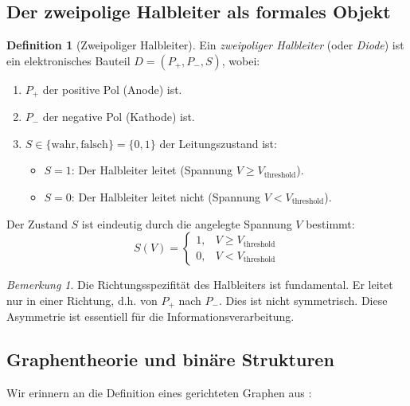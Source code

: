 \documentclass[12pt, a4paper]{article}
\theoremstyle{definition}
\newtheorem{definition}[theorem]{Definition}
\theoremstyle{remark}
\newtheorem{remark}[theorem]{Bemerkung}
\newcommand{\Bool}{\{\mathrm{wahr}, \mathrm{falsch}\}}
\begin{document}
\subsection{Der zweipolige Halbleiter als formales Objekt}
\label{subsec:halbleiter_definition}

\begin{definition}[Zweipoliger Halbleiter]
\label{def:halbleiter}
Ein \emph{zweipoliger Halbleiter} (oder \emph{Diode}) ist ein elektronisches Bauteil $D = (P_+, P_-, S)$, wobei:
\begin{enumerate}[label=(\alph*)]
  \item $P_+$ der positive Pol (Anode) ist.
  \item $P_-$ der negative Pol (Kathode) ist.
  \item $S \in \Bool = \{0, 1\}$ der Leitungszustand ist:
    \begin{itemize}
      \item $S = 1$: Der Halbleiter leitet (Spannung $V \geq V_{\mathrm{threshold}}$).
      \item $S = 0$: Der Halbleiter leitet nicht (Spannung $V < V_{\mathrm{threshold}}$).
    \end{itemize}
\end{enumerate}

Der Zustand $S$ ist eindeutig durch die angelegte Spannung $V$ bestimmt:
\[
  S(V) = \begin{cases} 1, & V \geq V_{\mathrm{threshold}} \\ 0, & V < V_{\mathrm{threshold}} \end{cases}
\]
\end{definition}

\begin{remark}
Die Richtungsspezifität des Halbleiters ist fundamental. Er leitet nur in einer Richtung, d.h. von $P_+$ nach $P_-$. Dies ist nicht symmetrisch. Diese Asymmetrie ist essentiell für die Informationsverarbeitung.
\end{remark}

\subsection{Graphentheorie und binäre Strukturen}
\label{subsec:graphen_binaer}

Wir erinnern an die Definition eines gerichteten Graphen aus \cite{epp2026matrgraph}:
\end{document}
